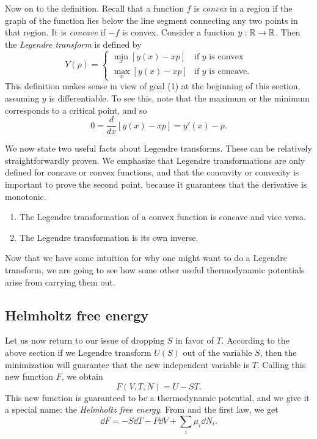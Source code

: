 Now on to the definition. Recall that a function $f$ is {\it convex}
 in a region if the graph of the function lies 
below the line segment connecting any two points in that region. It is 
{\it concave} if $-f$ is convex. Consider
a function $y:\mathbb{R}\to\mathbb{R}$. Then the 
{\it Legendre transform} is defined by
\begin{equation}
Y(p)=\begin{cases}
  \min_x [y(x)-xp] & \text{if $y$ is convex}\\
  \max_x [y(x)-xp] & \text{if $y$ is concave.}
\end{cases}
\end{equation}
This definition makes sense in view of goal (1) at the beginning of this
section, assuming $y$ is differentiable. To see this, note that the maximum
or the minimum corresponds to a critical point, and so
\begin{equation}\label{eq:legendremin}
  0=\frac{d}{dx}\left[y(x)-xp\right]=y'(x)-p.
\end{equation}

We now state two useful facts about Legendre transforms. These can
be relatively straightforwardly proven. We emphasize that Legendre
transformations are only defined for concave or convex functions, and
that the concavity or convexity is important to prove the second point,
because it guarantees that the derivative is monotonic.
\begin{proposition}{}{}
  \begin{enumerate}
    \item The Legendre transformation of a convex function is concave
          and vice versa.
    \item The Legendre transformation is its own inverse.
  \end{enumerate}
\end{proposition}

Now that we have some intuition for why one might want to do a
Legendre transform, we are going to see how some other useful
thermodynamic potentials arise from carrying them out.

\subsection{Helmholtz free energy}
Let us now return to our issue of dropping $S$ in favor
of $T$. According to the above section if we
Legendre transform $U(S)$ out of the variable $S$, then the minimization
will guarantee that the new independent variable is $T$. Calling
this new function $F$, we obtain
\begin{equation}\label{eq:helmholtz}
  F(V,T,N)=U-ST.
\end{equation}
This new function is guaranteed to be a thermodynamic potential, and
we give it a special name: the {\it Helmholtz free energy}.
From  and the first law, we get
\begin{equation}\label{eq:helmholtz1st}
  \dd F = -S\dd T-P\dd V+\sum_i\mu_i\dd{N}_i.
\end{equation}

